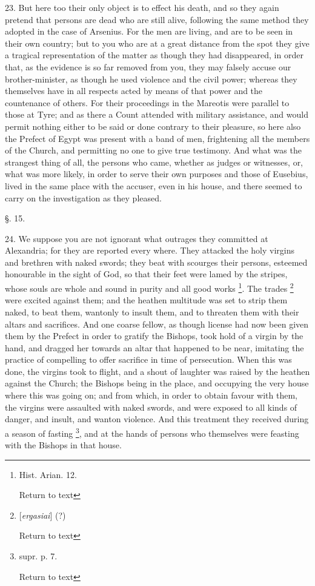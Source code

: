 23. But here too their only object is to effect
his death, and so they again pretend that persons are dead who are
still alive, following the same method they adopted in the case of
Arsenius. For the men are living, and are to be seen in their own
country; but to you who are at a great distance from the spot they
give a tragical representation of the matter as though they had
disappeared, in order that, as the evidence is so far removed from
you, they may falsely accuse our brother-minister, as though he used
violence and the civil power; whereas they themselves have in all
respects acted by means of that power and the countenance of others.
For their proceedings in the Mareotis were parallel to those at Tyre;
and as there a Count attended with military assistance, and would
permit nothing either to be said or done contrary to their pleasure,
so here also the Prefect of Egypt was present with a band of men,
frightening all the members of the Church, and permitting no one to
give true testimony. And what was the strangest thing of all, the
persons who came, whether as judges or witnesses, or, what was more
likely, in order to serve their own purposes and those of Eusebius,
lived in the same place with the accuser, even in his house, and there
seemed to carry on the investigation as they pleased.

§. 15.

24. We suppose you are not ignorant what outrages
they committed at Alexandria; for they are reported every where. They attacked the holy virgins and brethren with naked swords; they
beat with scourges their persons, esteemed honourable in the sight of
God, so that their feet were lamed by the stripes, whose souls are
whole and sound in purity and all good works \footnote{Hist. Arian. 12.

Return to text}. The trades \footnote{[\emph{ergasiai}] (?)

Return to text}
were excited against them; and the heathen multitude was set to strip
them naked, to beat them, wantonly to insult them, and to threaten
them with their altars and sacrifices. And one coarse fellow, as
though license had now been given them by the Prefect in order to
gratify the Bishops, took hold of a virgin by the hand, and dragged
her towards an altar that happened to be near, imitating the practice
of compelling to offer sacrifice in time of persecution. When this was
done, the virgins took to flight, and a shout of laughter was raised
by the heathen against the Church; the Bishops being in the place, and
occupying the very house where this was going on; and from which, in
order to obtain favour with them, the virgins were assaulted with
naked swords, and were exposed to all kinds of danger, and insult, and
wanton violence. And this treatment they received during a season of
fasting \footnote{supr. p. 7.

Return to text}, and at the
hands of persons who themselves were feasting with the Bishops in that
house.

